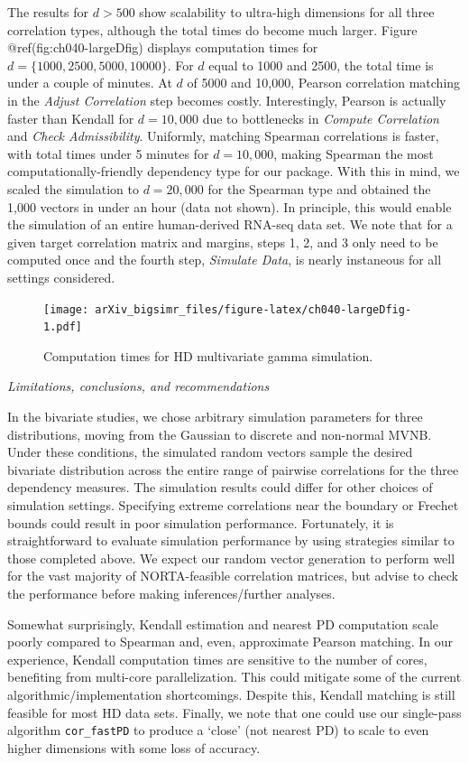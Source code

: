 \documentclass{article}
\begin{document}
The results for \(d > 500\) show scalability to ultra-high dimensions
for all three correlation types, although the total times do become much
larger. Figure @ref(fig:ch040-largeDfig) displays computation times for
\(d=\{1000, 2500, 5000, 10000\}\). For \(d\) equal to 1000 and 2500, the
total time is under a couple of minutes. At \(d\) of 5000 and 10,000,
Pearson correlation matching in the \emph{Adjust Correlation} step
becomes costly. Interestingly, Pearson is actually faster than Kendall
for \(d=10,000\) due to bottlenecks in \emph{Compute Correlation} and
\emph{Check Admissibility}. Uniformly, matching Spearman correlations is
faster, with total times under 5 minutes for \(d=10,000\), making
Spearman the most computationally-friendly dependency type for our
package. With this in mind, we scaled the simulation to \(d=20,000\) for
the Spearman type and obtained the 1,000 vectors in under an hour (data
not shown). In principle, this would enable the simulation of an entire
human-derived RNA-seq data set. We note that for a given target
correlation matrix and margins, steps 1, 2, and 3 only need to be
computed once and the fourth step, \emph{Simulate Data}, is nearly
instaneous for all settings considered.

\begin{figure}
\centering
\texttt{[image: arXiv\_bigsimr\_files/figure-latex/ch040-largeDfig-1.pdf]}
\caption{Computation times for HD multivariate gamma simulation.}
\end{figure}

\emph{Limitations, conclusions, and recommendations}

In the bivariate studies, we chose arbitrary simulation parameters for
three distributions, moving from the Gaussian to discrete and non-normal
MVNB. Under these conditions, the simulated random vectors sample the
desired bivariate distribution across the entire range of pairwise
correlations for the three dependency measures. The simulation results
could differ for other choices of simulation settings. Specifying
extreme correlations near the boundary or Frechet bounds could result in
poor simulation performance. Fortunately, it is straightforward to
evaluate simulation performance by using strategies similar to those
completed above. We expect our random vector generation to perform well
for the vast majority of NORTA-feasible correlation matrices, but advise
to check the performance before making inferences/further analyses.

Somewhat surprisingly, Kendall estimation and nearest PD computation
scale poorly compared to Spearman and, even, approximate Pearson
matching. In our experience, Kendall computation times are sensitive to
the number of cores, benefiting from multi-core parallelization. This
could mitigate some of the current algorithmic/implementation
shortcomings. Despite this, Kendall matching is still feasible for most
HD data sets. Finally, we note that one could use our single-pass
algorithm \texttt{cor\_fastPD} to produce a `close' (not nearest PD) to
scale to even higher dimensions with some loss of accuracy.
\end{document}
